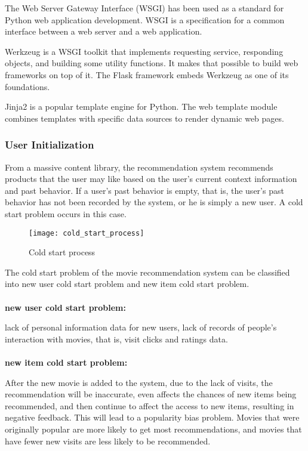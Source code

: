 \par The Web Server Gateway Interface (WSGI) has been used as a standard for Python web application development. WSGI is a specification for a common interface between a web server and a web application.
\par Werkzeug is a WSGI toolkit that implements requesting service, responding objects, and building some utility functions. It makes that possible to build web frameworks on top of it. The Flask framework embeds Werkzeug as one of its foundations.
\par Jinja2 is a popular template engine for Python. The web template module combines templates with specific data sources to render dynamic web pages.

\subsubsection{User Initialization}
From a massive content library, the recommendation system recommends products that the user may like based on the user's current context information and past behavior. If a user's past behavior is empty, that is, the user's past behavior has not been recorded by the system, or he is simply a new user. A cold start problem occurs in this case.
\begin{figure}[h]
\caption{Cold start process}
\centering
\texttt{[image: cold\_start\_process]}
\end{figure}
\par The cold start problem of the movie recommendation system can be classified into new user cold start problem and new item cold start problem.
\\
\\
\textbf{new user cold start problem: }
\par lack of personal information data for new users, lack of records of people's interaction with movies, that is, visit clicks and ratings data.
\\
\\
\textbf{new item cold start problem: }
\par After the new movie is added to the system, due to the lack of visits, the recommendation will be inaccurate, even affects the chances of new items being recommended, and then continue to affect the access to new items, resulting in negative feedback. This will lead to a popularity bias problem. Movies that were originally popular are more likely to get most recommendations, and movies that have fewer new visits are less likely to be recommended.

